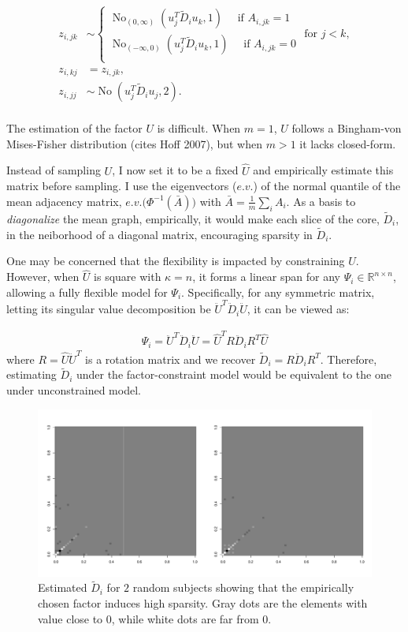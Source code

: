 \documentclass[10pt]{article}
\newcommand{\be}{\begin{equation}\begin{aligned}}
\newcommand{\ee}{\end{aligned}\end{equation}}
\newcommand{\bb}[1]{\mathbb{#1}}
\DeclareMathOperator{\No}{No}
\begin{document}
\be
z_{i,jk}&\sim \left\{ \begin{array}{cc} 
\No_{(0,\infty)}(u_{j}^T  \tilde D_{i} u_{k},1) \quad \text{ if } A_{i,jk}=1\\
\No_{(-\infty,0)}(u_{j}^T  \tilde D_{i} u_{k},1)\quad \text{ if } A_{i,jk}=0\\
\end{array} \text { for } j<k \right.,\\
z_{i,kj}& = z_{i,jk},\\
z_{i,jj}&\sim\No(u_{j}^T  \tilde D_{i} u_{j},2).\\
\ee

The estimation of the factor $U$ is difficult. When $m=1$, $U$ follows a Bingham-von Mises-Fisher distribution (cites Hoff 2007), but when $m>1$ it lacks closed-form.


Instead of sampling $U$, I now set it to be a fixed $\hat U$ and empirically estimate this matrix before sampling.  I use the eigenvectors ($e.v.$) of the normal quantile of the mean adjacency matrix, $e.v.\big(\Phi^{-1}(\bar A)\big)$ with $\bar A = \frac{1}{m} \sum_i A_i$. As a basis to {\it diagonalize} the mean graph, empirically, it would make each slice of the core, $\tilde D_{i}$, in the neiborhood of a diagonal matrix, encouraging sparsity in $\tilde D_{i}$.

One may be concerned that the flexibility is impacted by constraining $U$. However, when $\hat U$ is square with $\kappa=n$, it forms a linear span for any $\Psi_i \in \bb R^{n\times n}$, allowing a fully flexible model for $\Psi_i$. Specifically, for any symmetric matrix, letting its singular value decomposition be $\ddot{U}^T \ddot{D}_i \ddot{U}$, it can be viewed as:

\be
\Psi_i= \ddot{U}^T \ddot{D}_i \ddot{U} = \hat{U}^T R \ddot{D}_i R^T \hat{U}
\ee
where $R=\hat{U}\ddot{U}^T$ is a rotation matrix and we recover $\tilde{D}_i = R \ddot{D}_i R^T$. Therefore, estimating $\tilde{D}_i $ under the factor-constraint model would be equivalent to the one under unconstrained model.



\begin{figure}[H]
 \includegraphics[width=1\textwidth]{D}
\caption{Estimated $\tilde D_i$ for $2$ random subjects showing that the empirically chosen factor induces high sparsity. Gray dots are the elements with value close to $0$, while white dots are far from 0.}
\label{demoD}
\end{figure}
\end{document}

